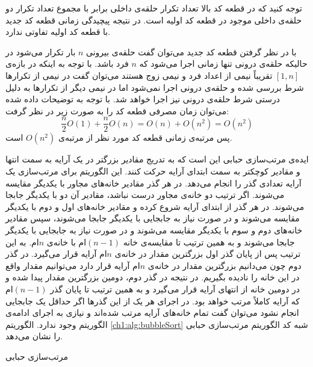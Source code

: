 {توجه کنید که در قطعه کد بالا تعداد تکرار حلقه‌ی داخلی برابر با مجموع تعداد تکرار دو حلقه‌ی {} داخلی موجود در قطعه کد اولیه است. در نتیجه پیچیدگی زمانی قطعه کد جدید با قطعه کد اولیه تفاوتی ندارد.

با در نظر گرفتن قطعه کد جدید می‌توان گفت حلقه‌ی بیرونی {$n$} بار تکرار می‌شود در حالیکه حلقه‌ی درونی تنها زمانی اجرا می‌شود که {$n$} فرد باشد. با توجه به اینکه در بازه‌ی {$[1,n]$} تقریباً نیمی از اعداد فرد و نیمی زوج هستند می‌توان گفت در نیمی از تکرارها شرط {} بررسی شده و حلقه‌ی درونی اجرا نمی‌شود اما در نیمی دیگر از تکرارها به دلیل درستی شرط {} حلقه‌ی درونی نیز اجرا خواهد شد. با توجه به توضیحات داده شده می‌توان زمان مصرفی قطعه کد را به صورت زیر در نظر گرفت:
\begin{equation*}
\dfrac{n}{2}O(1) + \dfrac{n}{2}O(n) = O(n) + O(n^2) = O(n^2)
\end{equation*}
پس مرتبه‌ی زمانی قطعه کد مورد نظر از مرتبه‌ی {$O(n^2)$} است.

 ایده‌ی مرتب‌سازی حبابی این است که به تدریج مقادیر بزرگتر در یک آرایه به سمت انتها و مقادیر کوچکتر به سمت ابتدای آرایه حرکت کنند. این الگوریتم برای مرتب‌سازی یک آرایه تعدادی گذر را انجام می‌دهد. در هر گذر مقادیر خانه‌های مجاور با یکدیگر مقایسه می‌شوند. اگر ترتیب دو خانه‌ی مجاور درست نباشد، مقادیر آن دو با یکدیگر جابجا می‌شوند. در هر گذر از ابتدای آرایه شروع کرده و مقادیر خانه‌های اول و دوم با یکدیگر مقایسه می‌شوند و در صورت نیاز به جابجایی با یکدیگر جابجا می‌شوند، سپس مقادیر خانه‌های دوم و سوم با یکدیگر مقایسه می‌شوند و در صورت نیاز به جابجایی با یکدیگر جابجا می‌شوند و به همین ترتیب تا مقایسه‌ی خانه {$(n-1)$}ام با خانه‌ی {$n$}ام. به این ترتیب پس از پایان گذر اول بزرگترین مقدار در خانه‌ی {$n$}ام آرایه قرار می‌گیرد. در گذر دوم چون می‌دانیم بزرگترین مقدار در خانه‌ی {$n$}ام آرایه قرار دارد می‌توانیم مقدار واقع در این خانه را نادیده بگیریم. در نتیجه در گذر دوم، دومین بزرگترین مقدار پیدا شده و در دومین خانه از انتهای آرایه قرار می‌گیرد و به همین ترتیب تا پایان گذر {$(n-1)$}ام که آرایه کاملاً مرتب خواهد بود. در اجرای هر یک از این گذرها اگر حداقل یک جابجایی‌ انجام نشود می‌توان گفت تمام خانه‌های آرایه مرتب شده‌اند و نیازی به اجرای ادامه‌ی الگوریتم وجود ندارد. الگوریتم {\eqref{ch1:alg:bubbleSort}} شبه کد الگوریتم مرتب‌سازی حبابی را نشان می‌دهد.

\begin{algorithm}
\caption{مرتب‌سازی حبابی}\label{ch1:alg:bubbleSort}
\begin{latin}
\end{latin}
\end{algorithm}

}
